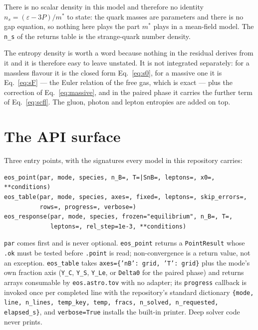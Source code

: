 \documentclass[aps,prc,onecolumn,superscriptaddress,nofootinbib,10pt]{revtex4-2}
\begin{document}
There is no scalar density in this model and therefore no identity
$n_s = (\varepsilon - 3P)/m^*$ to state: the quark masses are parameters and
there is no gap equation, so nothing here plays the part $m^*$ plays in a
mean-field model. The \texttt{n\_s} of the returns table is the strange-quark
number density.

The entropy density is worth a word because nothing in the residual derives
from it and it is therefore easy to leave unstated. It is not integrated
separately: for a massless flavour it is the closed form
Eq.~\eqref{eq:s0}, for a massive one it is Eq.~\eqref{eq:sF} --- the Euler
relation of the free gas, which is exact --- plus the correction of
Eq.~\eqref{eq:massive}, and in the paired phase it carries the further term of
Eq.~\eqref{eq:scfl}. The gluon, photon and lepton entropies are added on top.

\section{The API surface}
\label{sec:api}

Three entry points, with the signatures every model in this repository carries:
%
\begin{verbatim}
eos_point(par, mode, species, n_B=, T=|SnB=, leptons=, x0=, **conditions)
eos_table(par, mode, species, axes=, fixed=, leptons=, skip_errors=,
          rows=, progress=, verbose=)
eos_response(par, mode, species, frozen="equilibrium", n_B=, T=,
             leptons=, rel_step=1e-3, **conditions)
\end{verbatim}
%
\texttt{par} comes first and is never optional. \texttt{eos\_point} returns a
\texttt{PointResult} whose \texttt{.ok} must be tested before \texttt{.point}
is read; non-convergence is a return value, not an exception.
\texttt{eos\_table} takes \texttt{axes=\{'nB': grid, 'T': grid\}} plus the
mode's own fraction axis (\texttt{Y\_C}, \texttt{Y\_S}, \texttt{Y\_Le}, or
\texttt{Delta0} for the paired phase) and returns arrays consumable by
\texttt{eos.astro.tov} with no adapter; its \texttt{progress} callback is
invoked once per completed line with the repository's standard dictionary
\texttt{\{mode, line, n\_lines, temp\_key, temp, fracs, n\_solved,
n\_requested, elapsed\_s\}}, and \texttt{verbose=True} installs the built-in
printer. Deep solver code never prints.
\end{document}
